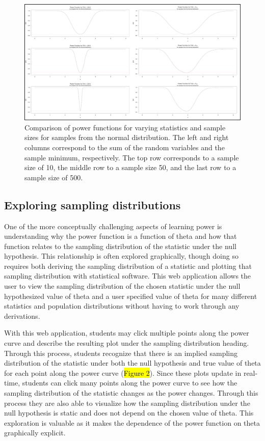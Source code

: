 \documentclass{TISE}
\begin{document}
\newpage

\begin{figure}[H]
	\centering
	\includegraphics[width=\textwidth]{varyingn.png}
	\caption{Comparison of power functions for varying statistics and sample sizes for samples from the normal distribution. The left and right columns correspond to the sum of the random variables and the sample minimum, respectively. The top row corresponds to a sample size of 10, the middle row to a sample size 50, and the last row to a sample size of 500.}
\end{figure}

\subsection{Exploring sampling distributions}

One of the more conceptually challenging aspects of learning power is understanding why the power function is a function of theta and how that function relates to the sampling distribution of the statistic under the null hypothesis. This relationship is often explored graphically, though doing so requires both deriving the sampling distribution of a statistic and plotting that sampling distribution with statistical software. This web application allows the user to view the sampling distribution of the chosen statistic under the null hypothesized value of theta and a user specified value of theta for many different statistics and population distributions without having to work through any derivations. 

With this web application, students may click multiple points along the power curve and describe the resulting plot under the sampling distribution heading. Through this process, students recognize that there is an implied sampling distribution of the statistic under both the null hypothesis and true value of theta for each point along the power curve (\hl{Figure 2}). Since these plots update in real-time, students can click many points along the power curve to see how the sampling distribution of the statistic changes as the power changes. Through this process they are also able to visualize how the sampling distribution under the null hypothesis is static and does not depend on the chosen value of theta. This exploration is valuable as it makes the dependence of the power function on theta graphically explicit.
\end{document}
